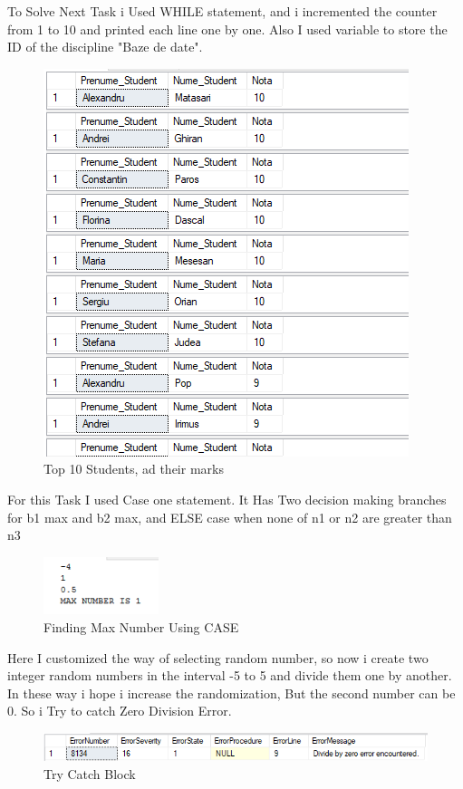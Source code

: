 \documentclass[12pt]{article}
\begin{document}
        To Solve Next Task i Used WHILE statement, and i incremented the counter from 1 to 10 and printed each line one by one. Also I used variable to store the ID of the discipline "Baze de date".
        \begin{figure}[H]
                \centering
                \includegraphics[width=.9\textwidth]{img2.png}
                \caption{Top 10 Students, ad their marks}
        \end{figure}
        \vspace{0.5 cm}

        For this Task I used Case one statement. It Has Two decision making branches for b1 max and b2 max, and  ELSE case when none of n1 or n2 are greater than n3
        \begin{figure}[H]
                \centering
                \includegraphics[width=0.3\textwidth]{img3.png}
                \caption{Finding Max Number Using CASE}
        \end{figure}
        \vspace{0.5 cm}

        Here I customized the way of selecting random number, so now i create two integer random numbers  in the interval -5 to 5 and divide them one by another. In these way i hope i increase the randomization, But the second number can be 0. So i Try to catch Zero Division Error.
        \begin{figure}[H]
                \centering
                \includegraphics[width=.95\textwidth]{img4.png}
                \caption{Try Catch Block }
        \end{figure}
        \vspace{0.5 cm}
\end{document}
